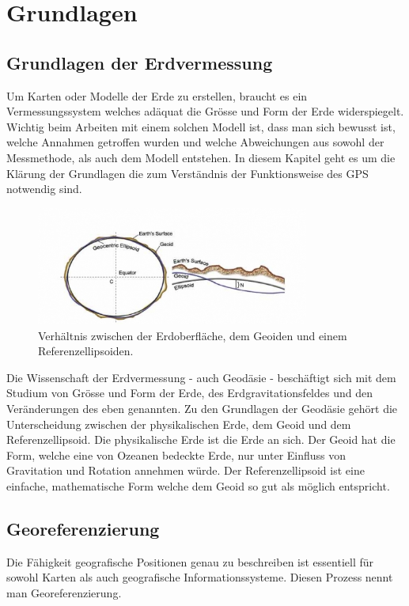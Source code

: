 \clearpage
\section{Grundlagen}
\subsection{Grundlagen der Erdvermessung}
Um Karten oder Modelle der Erde zu erstellen, braucht es ein Vermessungssystem welches adäquat die Grösse und Form der Erde widerspiegelt. Wichtig beim Arbeiten mit einem solchen Modell ist, dass man sich bewusst ist, welche Annahmen getroffen wurden und welche Abweichungen aus sowohl der Messmethode, als auch dem Modell entstehen. In diesem Kapitel geht es um die Klärung der Grundlagen die zum Verständnis der Funktionsweise des GPS notwendig sind. \cite{geodesy}

\begin{figure}[h]
  \centering
  \includegraphics[width=0.8\textwidth]{images/geoid.jpg}
  \caption[Erde, Geoid und Referenzellipsoid]{Verhältnis zwischen der Erdoberfläche, dem Geoiden und einem Referenzellipsoiden. \cite{geodesy}}
  \label{fig:geoid}
\end{figure}

Die Wissenschaft der Erdvermessung - auch Geodäsie - beschäftigt sich mit dem Studium von Grösse und Form der Erde, des Erdgravitationsfeldes und den Veränderungen des eben genannten. Zu den Grundlagen der Geodäsie gehört die Unterscheidung zwischen der physikalischen Erde, dem Geoid und dem Referenzellipsoid. Die physikalische Erde ist die Erde an sich. Der Geoid hat die Form, welche eine von Ozeanen bedeckte Erde, nur unter Einfluss von Gravitation und Rotation annehmen würde. Der Referenzellipsoid ist eine einfache, mathematische Form welche dem Geoid so gut als möglich entspricht. \cite{geodesy}

\subsection{Georeferenzierung}
Die Fähigkeit geografische Positionen genau zu beschreiben ist essentiell für sowohl Karten als auch geografische Informationssysteme. Diesen Prozess nennt man Georeferenzierung.

